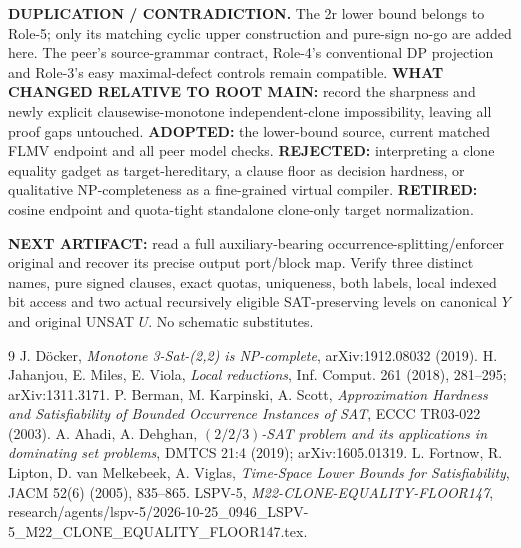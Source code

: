 \documentclass[11pt]{article}
\begin{document}
\textbf{DUPLICATION / CONTRADICTION.} The 2r lower bound belongs to Role-5; only its matching cyclic upper construction and pure-sign no-go are added here. The peer's source-grammar contract, Role-4's conventional DP projection and Role-3's easy maximal-defect controls remain compatible. \textbf{WHAT CHANGED RELATIVE TO ROOT MAIN:} record the sharpness and newly explicit clausewise-monotone independent-clone impossibility, leaving all proof gaps untouched. \textbf{ADOPTED:} the lower-bound source, current matched FLMV endpoint and all peer model checks. \textbf{REJECTED:} interpreting a clone equality gadget as target-hereditary, a clause floor as decision hardness, or qualitative NP-completeness as a fine-grained virtual compiler. \textbf{RETIRED:} cosine endpoint and quota-tight standalone clone-only target normalization.

\textbf{NEXT ARTIFACT:} read a full auxiliary-bearing occurrence-splitting/enforcer original and recover its precise output port/block map. Verify three distinct names, pure signed clauses, exact quotas, uniqueness, both labels, local indexed bit access and two actual recursively eligible SAT-preserving levels on canonical $Y$ and original UNSAT $U$. No schematic substitutes.

\begin{thebibliography}{9}
 J. D\"ocker, \emph{Monotone 3-Sat-(2,2) is NP-complete}, arXiv:1912.08032 (2019).
 H. Jahanjou, E. Miles, E. Viola, \emph{Local reductions}, Inf. Comput. 261 (2018), 281--295; arXiv:1311.3171.
 P. Berman, M. Karpinski, A. Scott, \emph{Approximation Hardness and Satisfiability of Bounded Occurrence Instances of SAT}, ECCC TR03-022 (2003).
 A. Ahadi, A. Dehghan, \emph{$(2/2/3)$-SAT problem and its applications in dominating set problems}, DMTCS 21:4 (2019); arXiv:1605.01319.
 L. Fortnow, R. Lipton, D. van Melkebeek, A. Viglas, \emph{Time-Space Lower Bounds for Satisfiability}, JACM 52(6) (2005), 835--865.
 LSPV-5, \emph{M22-CLONE-EQUALITY-FLOOR147}, research/agents/lspv-5/2026-10-25\_0946\_LSPV-5\_M22\_CLONE\_EQUALITY\_FLOOR147.tex.
\end{thebibliography}
\end{document}
